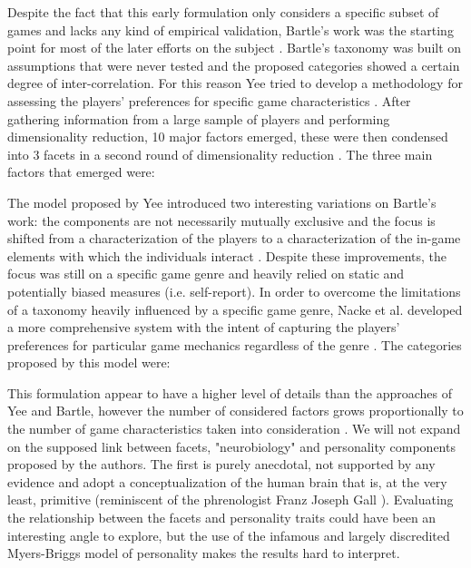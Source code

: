 

Despite the fact that this early formulation only considers a specific subset of games and lacks any kind of empirical validation, Bartle's work was the starting point for most of the later efforts on the subject \cite{bartle1996hearts}. Bartle's taxonomy was built on assumptions that were never tested and the proposed categories showed a certain degree of inter-correlation. For this reason Yee tried to develop a methodology for assessing the players’ preferences for specific game characteristics \cite{yee2006motivations}. After gathering information from a large sample of players and performing  dimensionality reduction, 10 major factors emerged, these were then condensed into 3 facets in a second round of dimensionality reduction \cite{yee2006motivations}. The three main factors that emerged were: 



The model proposed by Yee introduced two interesting variations on Bartle's work: the components are not necessarily mutually exclusive and the focus is shifted from a characterization of the players to a characterization of the in-game elements with which the individuals interact \cite{bartle1996hearts,yee2006motivations}. Despite these improvements, the focus was still on a specific game genre and heavily relied on static and potentially biased measures (i.e. self-report). In order to overcome the limitations of a taxonomy heavily influenced by a specific game genre, Nacke et al. developed a more comprehensive system with the intent of capturing the players’ preferences for particular game mechanics regardless of the genre \cite{nacke2011brainhex}. The categories proposed by this model were: 



This formulation appear to have a higher level of details than the approaches of Yee and Bartle, however the number of considered factors grows proportionally to the number of game characteristics taken into consideration \cite{nacke2011brainhex}. We will not expand on the supposed link between facets, "neurobiology" and personality components proposed by the authors. The first is purely anecdotal, not supported by any evidence and adopt a conceptualization of the human brain that is, at the very least, primitive (reminiscent of the phrenologist Franz Joseph Gall \cite{gall1835functions})\cite{nacke2011brainhex}. Evaluating the relationship between the facets and personality traits could have been an interesting angle to explore, but the use of the infamous and largely discredited Myers-Briggs model of personality \cite{boyle1995myers} makes the results hard to interpret. 

